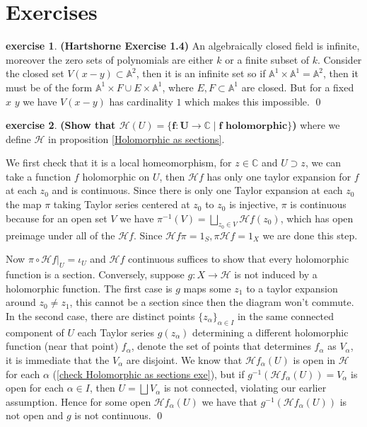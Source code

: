\documentclass[10.5pt]{article}
\theoremstyle{definition}
\newtheorem{exe}{exercise}
\newcommand{\set}[1]{\{#1\}}
\newcommand{\tor}{\text{ or }}
\begin{document}
    \section{Exercises}
    \begin{exe}\label{HS1.4}\textbf{(Hartshorne Exercise 1.4)}
        An algebraically closed field is infinite, moreover the zero sets of polynomials are either \(k\) or a finite subset of \(k\). Consider the closed set \(V(x-y) \subset \mathbb{A}^2\), then it is an infinite set so if \(\mathbb{A}^1\times \mathbb{A}^1 = \mathbb{A}^2\), then it must be of the form \(\mathbb{A}^1 \times F \cup E \times \mathbb{A}^1\), where \(E,F \subset \mathbb{A}^1\) are closed. But for a fixed \(x\) \tor \(y\) we have \(V(x-y)\) has cardinality \(1\) which makes this impossible. \qed
    \end{exe}
    \begin{exe}\label{Holomorphic as sections exe}
        \textbf{(Show that \(\mathcal{H}(U) = \mathbf{\set{f: U \to \mathbb{C} \mid f \text{ holomorphic}}}\))} where we define \(\mathcal{H}\) in proposition \ref{Holomorphic as sections}.

        We first check that it is a local homeomorphism, for \(z \in \mathbb{C}\) and \(U \supset z\), we can take a function \(f\) holomorphic on \(U\), then \(\mathcal{H}f\) has only one taylor expansion for \(f\) at each \(z_0\) and is continuous. Since there is only one Taylor expansion at each \(z_0\) the map \(\pi\) taking Taylor series centered at \(z_0\) to \(z_0\) is injective, \(\pi\) is continuous because for an open set \(V\) we have \(\pi^{-1}(V) = \bigsqcup_{z_0 \in V}\mathcal{H}f(z_0)\), which has open preimage under all of the \(\mathcal{H}f\). Since \(\mathcal{H}f\pi = 1_S, \pi \mathcal{H}f = 1_X\) we are done this step.

        Now \(\pi \circ \mathcal{H}f\vert_U = \iota_U\) and \(\mathcal{H}f\) continuous suffices to show that every holomorphic function is a section. Conversely, suppose \(g: X \to \mathcal{H}\) is not induced by a holomorphic function. The first case is \(g\) maps some \(z_1\) to a taylor expansion around \(z_0 \neq z_1\), this cannot be a section since then the diagram won't commute. In the second case, there are distinct points \(\set{z_\alpha}_{\alpha\in I}\) in the same connected component of \(U\) each Taylor series \(g(z_\alpha)\) determining a different holomorphic function (near that point) \(f_\alpha\), denote the set of points that determines \(f_\alpha\) as \(V_\alpha\), it is immediate that the \(V_\alpha\) are disjoint. We know that \(\mathcal{H} f_\alpha(U)\) is open in \(\mathcal{H}\) for each \(\alpha\) (\ref{check Holomorphic as sections exe}), but if \(g^{-1}(\mathcal{H} f_\alpha(U)) = V_\alpha\) is open for each \(\alpha \in I\), then \(U = \bigsqcup V_\alpha\) is not connected, violating our earlier assumption. Hence for some open \(\mathcal{H} f_\alpha(U)\) we have that \(g^{-1}(\mathcal{H} f_\alpha(U))\) is not open and \(g\) is not continuous. \qed


\end{exe}
\end{document}
